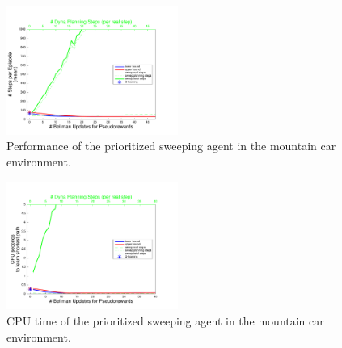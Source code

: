 \documentclass[letterpaper]{article}
\begin{document}
\begin{figure}[ht]
\centering
\includegraphics[width=0.5\textwidth]{MC_learning_vs_PRiterationsSweeping_DYNA_mean}
\caption{Performance of the prioritized sweeping agent in the mountain car environment.}
\label{fig:S6a}
\end{figure}

\begin{figure}[ht]
\centering
\includegraphics[width=0.5\textwidth]{MC_cpus_vs_PRiterations_sweeping_toGoal}
\caption{CPU time of the prioritized sweeping agent in the mountain car environment.}
\label{fig:S6b}
\end{figure}
\end{document}
